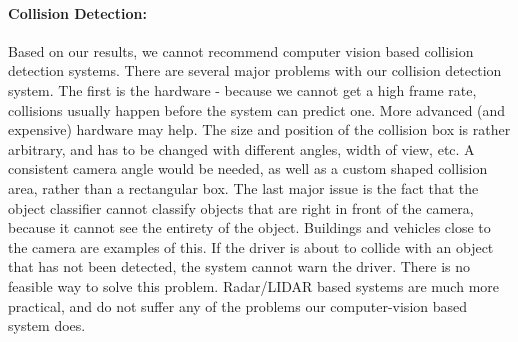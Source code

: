 \paragraph{Collision Detection:} Based on our results, we cannot recommend computer vision based collision detection systems.  There are several major problems with our collision detection system. The first is the hardware - because we cannot get a high frame rate, collisions usually happen before the system can predict one.  More advanced (and expensive) hardware may help.  The size and position of the collision box is rather arbitrary, and has to be changed with different angles, width of view, etc. A consistent camera angle would be needed, as well as a custom shaped collision area, rather than a rectangular box.  The last major issue is the fact that the object classifier cannot classify objects that are right in front of the camera, because it cannot see the entirety of the object.  Buildings and vehicles close to the camera are examples of this.  If the driver is about to collide with an object that has not been detected, the system cannot warn the driver.  There is no feasible way to solve this problem.  Radar/LIDAR based systems are much more practical, and do not suffer any of the problems our computer-vision based system does.

